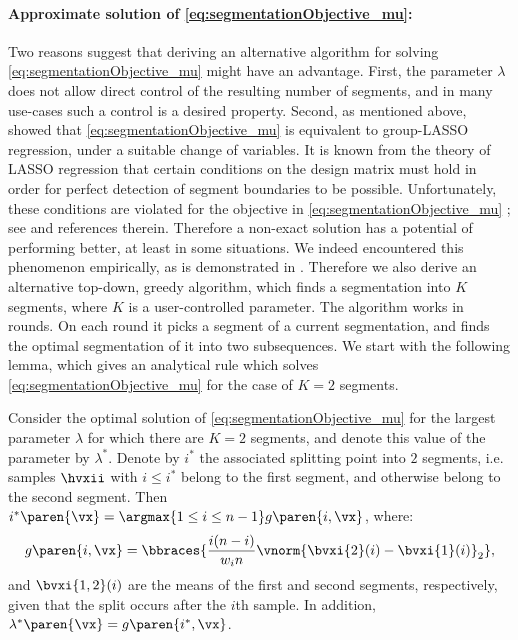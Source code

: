 \paragraph{Approximate solution of \eqref{eq:segmentationObjective_mu}:}\label{par:seg_approx_solution}
Two reasons suggest that deriving an alternative algorithm for solving \eqref{eq:segmentationObjective_mu} might have an advantage. %
First, the parameter $\lambda$
does not allow direct control of the resulting number of segments, and in many use-cases such a control is a desired property.
Second, as mentioned above,
\cite{bleakley2011group} showed that \eqref{eq:segmentationObjective_mu} is equivalent to group-LASSO regression, under a suitable change of variables. It is known from the theory of LASSO regression
that certain conditions on the design matrix %
must hold in order for perfect detection of segment boundaries to be possible. Unfortunately, these conditions are violated for the objective in \eqref{eq:segmentationObjective_mu} %
; see \cite{levy2007catching} and references therein. Therefore a non-exact solution has a potential of performing better, at least in some situations. We indeed encountered this phenomenon empirically, as is demonstrated in .
Therefore we also derive an alternative top-down, greedy algorithm, which finds a segmentation into $K$
segments, where $K$ is a user-controlled parameter. The algorithm works in rounds. On each round it picks a segment of a
current segmentation, and finds the optimal segmentation of it into two subsequences.
We start with the following lemma, which gives an analytical rule which solves \eqref{eq:segmentationObjective_mu} for the case of $K=2$ segments.
\begin{lemma}\label{lem:analyticalSolutionK=2}
Consider the optimal solution of \eqref{eq:segmentationObjective_mu} for the largest parameter $\lambda$ for which there are $K=2$ segments, and denote this value of the parameter by $\lambda^*$. Denote by $i^*$ the associated splitting point into $2$ segments, i.e. samples $\hvxii$ with $i\leq i^*$ belong to the first segment, and otherwise belong to the second segment. Then %
$i^*\paren{\vx} =\argmax{1\leq i\leq n-1}g\paren{i,\vx}$, where:
\begin{align}\label{eq:lambdaStarWeighted}
    g\paren{i,\vx} = \bbraces{\frac{i(n-i)}{w_in}\vnorm{\bvxi{2}(i)-\bvxi{1}(i)}_2},%
\end{align}
and $\bvxi{1,2}(i)$ are the means of the first and second segments, respectively, given that the split occurs after the $i$th sample. In addition, $\lambda^*\paren{\vx} = g\paren{i^*,\vx}$.
\end{lemma}
